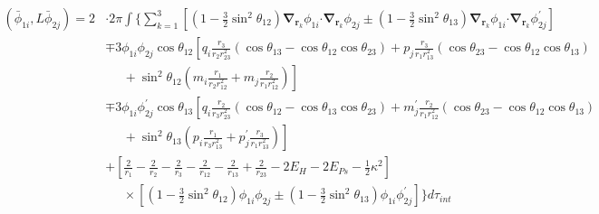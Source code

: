\documentclass[Dissertation.tex]{subfiles}
\begin{document}
\begin{align}
\label{eq:DWavePhi1Phi2}
\left(\bar{\phi}_{1i},L \bar{\phi}_{2j}\right) = 2 & \cdot 2\pi \int \Bigg\{ \sum_{k=1}^3 \left[ \left(1-\tfrac{3}{2}\sin^2\theta_{12}\right) \boldsymbol{\nabla}_{\!\mathbf{r}_k} \nonumber \phi_{1i} \boldsymbol{\cdot} \boldsymbol{\nabla}_{\!\mathbf{r}_k} \phi_{2j} \pm \left(1-\tfrac{3}{2}\sin^2\theta_{13}\right) \boldsymbol{\nabla}_{\!\mathbf{r}_k} \phi_{1i} \boldsymbol{\cdot} \boldsymbol{\nabla}_{\!\mathbf{r}_k} \phi_{2j}^\prime \right] \\
 \nonumber &\mp 3 \phi_{1i} \phi_{2j} \cos\theta_{12} \left[q_i \frac{r_3}{r_2 r_{23}^2} (\cos\theta_{13} - \cos\theta_{12} \cos\theta_{23}) + p_j \frac{r_3}{r_1 r_{13}^2}(\cos\theta_{23} - \cos\theta_{12} \cos\theta_{13})\right.\\
 \nonumber & \left. \;\;\;\;\;  + \sin^2\theta_{12} \left(m_i \frac{r_1}{r_2 r_{12}^2} + m_j \frac{r_2}{r_1 r_{12}^2} \right) \right] \\
 \nonumber &\mp 3 \phi_{1i} \phi_{2j}^\prime \cos\theta_{13} \left[q_i \frac{r_2}{r_3 r_{23}^2} (\cos\theta_{12} - \cos\theta_{13} \cos\theta_{23}) + m_j^\prime \frac{r_2}{r_1 r_{12}^2}(\cos\theta_{23} - \cos\theta_{12} \cos\theta_{13})\right.\\
 \nonumber & \left. \;\;\;\;\;  + \sin^2\theta_{13} \left(p_i \frac{r_1}{r_3 r_{13}^2} + p_j^\prime \frac{r_3}{r_1 r_{13}^2} \right) \right] \\
 \nonumber &+ \left. \left[\frac{2}{r_1} - \frac{2}{r_2} - \frac{2}{r_3} - \frac{2}{r_{12}} - \frac{2}{r_{13}} + \frac{2}{r_{23}} - 2 E_H - 2 E_{Ps} - \frac{1}{2}\kappa^2 \right] \right. \\
 &\;\;\;\;\; \times \left[\left(1-\tfrac{3}{2}\sin^2\theta_{12}\right) \phi_{1i} \phi_{2j} \pm \left(1-\tfrac{3}{2}\sin^2\theta_{13}\right) \phi_{1i} \phi_{2j}^\prime \right] \Bigg\} d\tau_{int}
\end{align}
\end{document}
